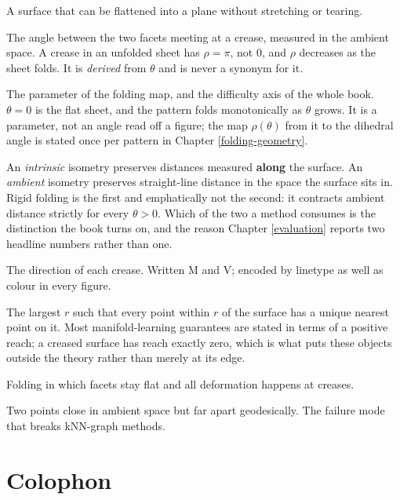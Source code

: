\documentclass[
  british,
  a4paper,
]{book}
\providecommand{\tightlist}{%
  \setlength{\itemsep}{0pt}\setlength{\parskip}{0pt}}
\begin{document}
\begin{description}
\tightlist
\item[\textbf{Developable surface}]
A surface that can be flattened into a plane without stretching or tearing.
\item[\textbf{Dihedral angle (\(\rho\))}]
The angle between the two facets meeting at a crease, measured in the ambient
space. A crease in an unfolded sheet has \(\rho = \pi\), not 0, and \(\rho\)
decreases as the sheet folds. It is \emph{derived} from \(\theta\) and is never a
synonym for it.
\item[\textbf{Folding parameter (\(\theta\))}]
The parameter of the folding map, and the difficulty axis of the whole book.
\(\theta = 0\) is the flat sheet, and the pattern folds monotonically as
\(\theta\) grows. It is a parameter, not an angle read off a figure; the map
\(\rho(\theta)\) from it to the dihedral angle is stated once per pattern in
Chapter \ref{folding-geometry}.
\item[\textbf{Isometry, intrinsic and ambient}]
An \emph{intrinsic} isometry preserves distances measured \textbf{along} the surface.
An \emph{ambient} isometry preserves straight-line distance in the space the
surface sits in. Rigid folding is the first and emphatically not the second:
it contracts ambient distance strictly for every \(\theta > 0\). Which of the
two a method consumes is the distinction the book turns on, and the reason
Chapter \ref{evaluation} reports two headline numbers rather than one.
\item[\textbf{Mountain / valley assignment}]
The direction of each crease. Written M and V; encoded by linetype as well as
colour in every figure.
\item[\textbf{Reach}]
The largest \(r\) such that every point within \(r\) of the surface has a unique
nearest point on it. Most manifold-learning guarantees are stated in terms of
a positive reach; a creased surface has reach exactly zero, which is what puts
these objects outside the theory rather than merely at its edge.
\item[\textbf{Rigid origami}]
Folding in which facets stay flat and all deformation happens at creases.
\item[\textbf{Short-circuit}]
Two points close in ambient space but far apart geodesically. The failure mode
that breaks kNN-graph methods.
\end{description}

\chapter*{Colophon}\label{colophon}
\end{document}
